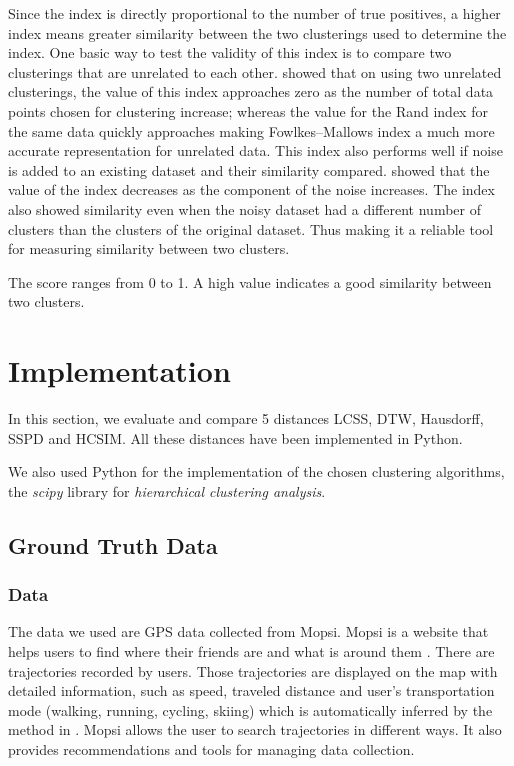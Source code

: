 \documentclass[a4paper, 12pt]{article}
\begin{document}
Since the index is directly proportional to the number of true positives, a higher index means greater similarity between the two clusterings used to determine the index. One basic way to test the validity of this index is to compare two clusterings that are unrelated to each other. \cite{fowlkes1983method} showed that on using two unrelated clusterings, the value of this index approaches zero as the number of total data points chosen for clustering increase; whereas the value for the Rand index \citep{steinley2004properties} for the same data quickly approaches making Fowlkes–Mallows index a much more accurate representation for unrelated data. This index also performs well if noise is added to an existing dataset and their similarity compared. \cite{fowlkes1983method} showed that the value of the index decreases as the component of the noise increases. The index also showed similarity even when the noisy dataset had a different number of clusters than the clusters of the original dataset. Thus making it a reliable tool for measuring similarity between two clusters. 

The score ranges from 0 to 1. A high value indicates a good similarity between two clusters.

\section{Implementation}

In this section, we evaluate and compare 5 distances LCSS, DTW, Hausdorff, SSPD and HCSIM. All these distances have been implemented in Python. 

We also used Python for the implementation of the chosen clustering algorithms, the \textit{scipy} library for \textit{hierarchical clustering analysis}.

\subsection{Ground Truth Data}

\subsubsection{Data}

The data we used are GPS data collected from Mopsi. Mopsi is a website that helps users to find where their friends are and what is around them \citep{mariescu2013detecting}. There are trajectories recorded by users. Those trajectories are displayed on the map with detailed information, such as speed, traveled distance and user’s transportation mode (walking, running, cycling, skiing) which is automatically inferred by the method in \cite{waga2012detecting}. Mopsi allows the user to search trajectories in different ways. It also provides recommendations and tools for managing data collection.
\end{document}
